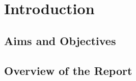 \chapter{Introduction}\label{ch:introduction}


\section{Aims and Objectives}\label{sec:aims-and-objectives}


\section{Overview of the Report}\label{sec:overview-of-the-report}

